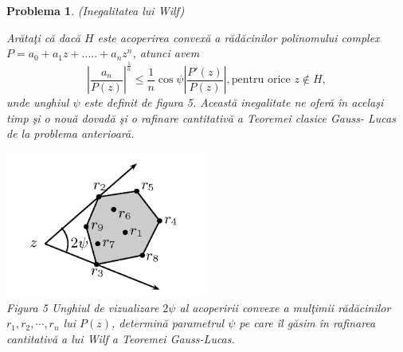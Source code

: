 \documentclass[a4paper,12pt,oneside]{report}
\newtheorem{problem}{Problema}
\begin{document}
\begin{problem} (Inegalitatea lui Wilf)

Ar\u{a}ta\c{t}i c\u{a} dac\u{a} \(H\) este acoperirea convex\u{a} a r\u{a}d\u{a}cinilor polinomului complex \(P = a_{0} + a_{1}z + ..... +a_{n}z^{n}\), atunci avem
\begin{displaymath}
  \left | \frac{a_{n}}{P\left ( z \right )} \right |^{\frac{1}{n}}\leq \frac{1}n\cos{\psi }\left | \frac{{P}'\left ( z \right )}{P\left ( z \right )} \right | , \text{pentru orice } z\notin H, \label{eq:2.16} \tag{2.16}
\end{displaymath}
unde unghiul \(\psi\) este definit de figura 5. Aceast\u{a} inegalitate ne ofer\u{a} \^{i}n acela\c{s}i timp \c{s}i o nou\u{a} dovad\u{a} \c{s}i o rafinare cantitativ\u{a}  a Teoremei clasice Gauss- Lucas de la problema anterioar\u{a}.
\begin{center}
  \includegraphics[width=0.5\textwidth]{fig_pb14.png}
  \\ Figura 5  Unghiul de vizualizare \(2\psi\) al acoperirii convexe a mul\c{t}imii r\u{a}d\u{a}cinilor \(r_{1} , r_{2} , \cdots, r_{n}\)  lui \(P\left ( z \right )\), determin\u{a} parametrul \(\psi\) pe care \^{i}l g\u{a}sim \^{i}n rafinarea cantitativ\u{a} a lui Wilf a Teoremei Gauss-Lucas.
\end{center}

\end{problem}
\end{document}
